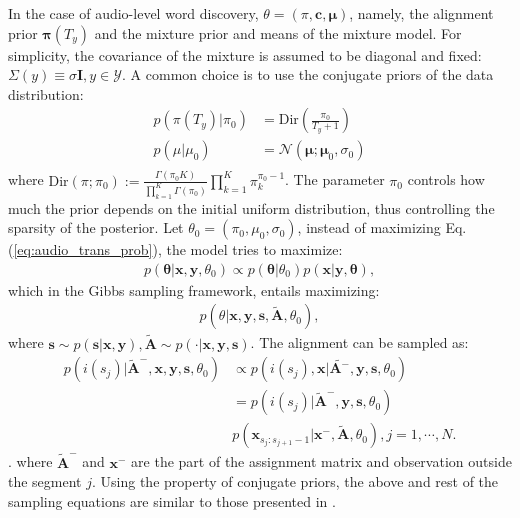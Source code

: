 In the case of audio-level word discovery, $\theta = (\pi, \mathbf c, \mathbf \mu)$, namely, the alignment prior $\mathbf \pi(T_y)$ and the mixture prior and means of the mixture model. For simplicity, the covariance of the mixture is assumed to be diagonal and fixed: $\Sigma(y) \equiv \sigma \mathbf I, y \in \mathcal Y$. A common choice is to use the conjugate priors of the data distribution:
\begin{align}\label{eq:parameter_prior}
   p(\pi(T_y)|\pi_0) &= \text{Dir}(\frac{\pi_0}{T_y+1})\\
   p(\mu|\mu_0) &= \mathcal N(\mathbf \mu; \mathbf \mu_0, \sigma_0)\\
\end{align}
where $\text{Dir}(\pi;\pi_0) := \frac{\Gamma(\pi_0 K)}{\prod_{k=1}^K\Gamma(\pi_0)}\prod_{k=1}^K\pi_k^{\pi_0-1}$. The parameter $\pi_0$ controls how much the prior depends on the initial uniform distribution, thus controlling the sparsity of the posterior. Let $\theta_0 = (\pi_0, \mu_0, \sigma_0)$, instead of maximizing Eq. (\ref{eq:audio_trans_prob}), the model tries to maximize:
\begin{align}
    p(\mathbf \theta|\mathbf x, \mathbf y, \theta_0) \propto p(\mathbf \theta|\theta_0) p(\mathbf x|\mathbf y, \mathbf \theta),
\end{align}
which in the Gibbs sampling framework, entails maximizing:
\begin{align}
    p(\theta|\mathbf x, \mathbf y, \mathbf s, \tilde{\mathbf A}, \theta_0),
\end{align}
where $\mathbf s \sim p(\mathbf s|\mathbf x, \mathbf y), \tilde{\mathbf A} \sim p(\cdot|\mathbf x, \mathbf y, \mathbf s)$. The alignment can be sampled as:
\begin{align}\label{eq:sample_alignment}
    p(i(s_j)|\tilde{\mathbf A}^-, \mathbf x, \mathbf y, \mathbf s, \theta_0) &\propto p(i(s_j), \mathbf x|\tilde{\mathbf A^-}, \mathbf y, \mathbf s, \theta_0) \\
    &= p(i(s_j)|\tilde{\mathbf A}^-, \mathbf y, \mathbf s, \theta_0) \\
    &p(\mathbf x_{s_j:s_{j+1}-1}|\mathbf x^-, \tilde{\mathbf A}, \theta_0), j = 1, \cdots, N.
\end{align}.
where $\tilde{\mathbf A}^-$ and $\mathbf x^-$ are the part of the assignment matrix and observation outside the segment $j$. Using the property of conjugate priors, the above and rest of the sampling equations are similar to those presented in \cite{Kamper2016, Kamper2017}.

